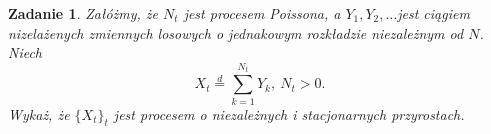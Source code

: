 \documentclass[12pt]{article}
\newtheorem{zd}{Zadanie}
\begin{document}
\begin{zd}
	Załóżmy, że $N_t$ jest procesem Poissona, a $Y_1, Y_2, \dots $jest ciągiem nizelażenych zmiennych losowych o jednakowym rozkładzie niezależnym od $N$. Niech 
	\begin{displaymath}
	X_t \stackrel{d}{=} \sum_{k = 1}^{N_t}Y_k,\ N_t > 0.
	\end{displaymath}
	Wykaż, że $\{X_t\}_t $ jest procesem o niezależnych i stacjonarnych przyrostach.
\end{zd}
\end{document}

